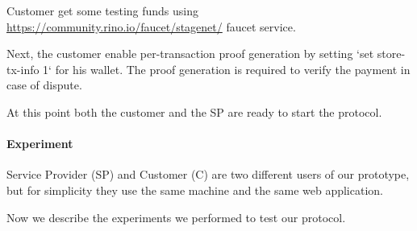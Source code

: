 \documentclass{ieeeaccess}
\begin{document}
Customer get some testing funds using \url{https://community.rino.io/faucet/stagenet/} faucet service.

Next, the customer enable per-transaction proof generation by setting `set store-tx-info 1` for his wallet.  The proof generation is required to verify the payment in case of dispute.

At this point both the customer and the SP are ready to start the protocol.

\paragraph{Experiment}

Service Provider (SP) and Customer (C) are two different users of our prototype, but for simplicity they use the same machine and the same web application.

Now we describe the experiments we performed to test our protocol.
\end{document}
